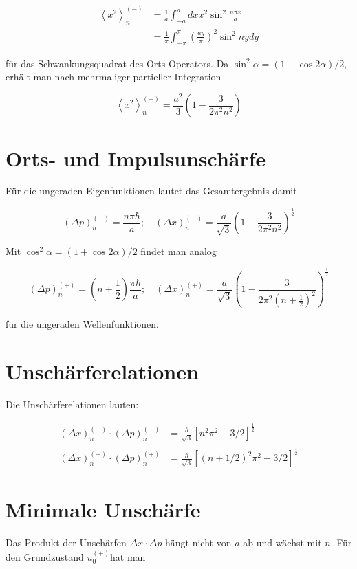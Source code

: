 \documentclass[10pt, letterpaper]{article}
\begin{document}
$$
\begin{aligned}
\left\langle x^{2}\right\rangle_{n}^{(-)} & =\frac{1}{a} \int_{-a}^{a} d x x^{2} \sin ^{2} \frac{n \pi x}{a} \\
& =\frac{1}{\pi} \int_{-\pi}^{\pi}\left(\frac{a y}{\pi}\right)^{2} \sin ^{2} n y d y
\end{aligned}
$$

für das Schwankungsquadrat des Orts-Operators. Da $\sin ^{2} \alpha=(1-\cos 2 \alpha) / 2$, erhält man nach mehrmaliger partieller Integration

$$
\left\langle x^{2}\right\rangle_{n}^{(-)}=\frac{a^{2}}{3}\left(1-\frac{3}{2 \pi^{2} n^{2}}\right)
$$

\section*{Orts- und Impulsunschärfe}
Für die ungeraden Eigenfunktionen lautet das Gesamtergebnis damit

$$
(\Delta p)_{n}^{(-)}=\frac{n \pi \hbar}{a} ; \quad(\Delta x)_{n}^{(-)}=\frac{a}{\sqrt{3}}\left(1-\frac{3}{2 \pi^{2} n^{2}}\right)^{\frac{1}{2}}
$$

Mit $\cos ^{2} \alpha=(1+\cos 2 \alpha) / 2$ findet man analog

$$
(\Delta p)_{n}^{(+)}=\left(n+\frac{1}{2}\right) \frac{\pi \hbar}{a} ; \quad(\Delta x)_{n}^{(+)}=\frac{a}{\sqrt{3}}\left(1-\frac{3}{2 \pi^{2}\left(n+\frac{1}{2}\right)^{2}}\right)^{\frac{1}{2}}
$$

für die ungeraden Wellenfunktionen.

\section*{Unschärferelationen}
Die Unschärferelationen lauten:

$$
\begin{aligned}
(\Delta x)_{n}^{(-)} \cdot(\Delta p)_{n}^{(-)} & =\frac{\hbar}{\sqrt{3}}\left[n^{2} \pi^{2}-3 / 2\right]^{\frac{1}{2}} \\
(\Delta x)_{n}^{(+)} \cdot(\Delta p)_{n}^{(+)} & =\frac{\hbar}{\sqrt{3}}\left[(n+1 / 2)^{2} \pi^{2}-3 / 2\right]^{\frac{1}{2}}
\end{aligned}
$$

\section*{Minimale Unschärfe}
Das Produkt der Unschärfen $\Delta x \cdot \Delta p$ hängt nicht von $a$ ab und wächst mit $n$. Für den Grundzustand $u_{0}^{(+)}$hat man
\end{document}
